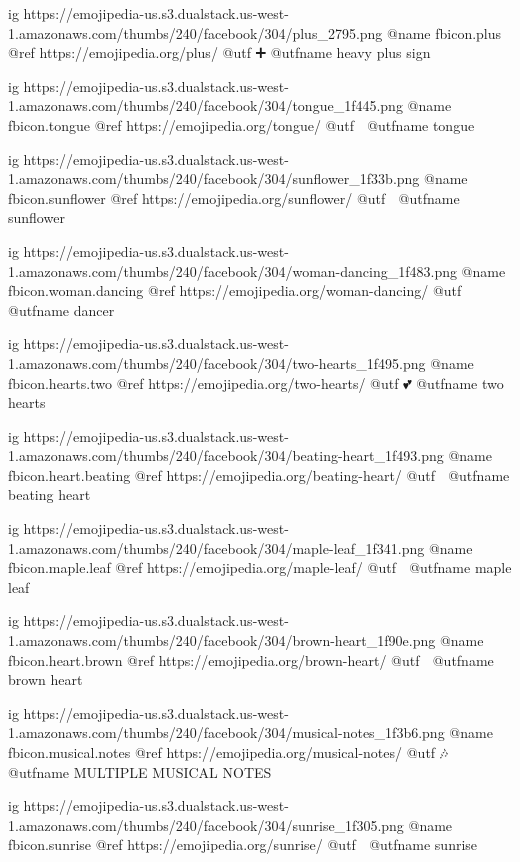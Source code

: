 	ig https://emojipedia-us.s3.dualstack.us-west-1.amazonaws.com/thumbs/240/facebook/304/plus_2795.png
	@name fbicon.plus
	@ref https://emojipedia.org/plus/
	@utf ➕
	@utfname heavy plus sign

	ig https://emojipedia-us.s3.dualstack.us-west-1.amazonaws.com/thumbs/240/facebook/304/tongue_1f445.png
	@name fbicon.tongue
	@ref https://emojipedia.org/tongue/
	@utf 👅
	@utfname tongue

	ig https://emojipedia-us.s3.dualstack.us-west-1.amazonaws.com/thumbs/240/facebook/304/sunflower_1f33b.png
	@name fbicon.sunflower
	@ref https://emojipedia.org/sunflower/
	@utf 🌻
	@utfname sunflower

	ig https://emojipedia-us.s3.dualstack.us-west-1.amazonaws.com/thumbs/240/facebook/304/woman-dancing_1f483.png
	@name fbicon.woman.dancing
	@ref https://emojipedia.org/woman-dancing/
	@utf 💃
	@utfname dancer

	ig https://emojipedia-us.s3.dualstack.us-west-1.amazonaws.com/thumbs/240/facebook/304/two-hearts_1f495.png
	@name fbicon.hearts.two
	@ref https://emojipedia.org/two-hearts/
	@utf 💕
	@utfname two hearts

	ig https://emojipedia-us.s3.dualstack.us-west-1.amazonaws.com/thumbs/240/facebook/304/beating-heart_1f493.png
	@name fbicon.heart.beating
	@ref https://emojipedia.org/beating-heart/
	@utf 💓
	@utfname beating heart

	ig https://emojipedia-us.s3.dualstack.us-west-1.amazonaws.com/thumbs/240/facebook/304/maple-leaf_1f341.png
	@name fbicon.maple.leaf
	@ref https://emojipedia.org/maple-leaf/
	@utf 🍁
	@utfname maple leaf

	ig https://emojipedia-us.s3.dualstack.us-west-1.amazonaws.com/thumbs/240/facebook/304/brown-heart_1f90e.png
	@name fbicon.heart.brown
	@ref https://emojipedia.org/brown-heart/
	@utf 🤎
	@utfname brown heart

	ig https://emojipedia-us.s3.dualstack.us-west-1.amazonaws.com/thumbs/240/facebook/304/musical-notes_1f3b6.png
	@name fbicon.musical.notes
	@ref https://emojipedia.org/musical-notes/
	@utf 🎶
	@utfname MULTIPLE MUSICAL NOTES

	ig https://emojipedia-us.s3.dualstack.us-west-1.amazonaws.com/thumbs/240/facebook/304/sunrise_1f305.png
	@name fbicon.sunrise
	@ref https://emojipedia.org/sunrise/
	@utf 🌅
	@utfname sunrise

\fi

